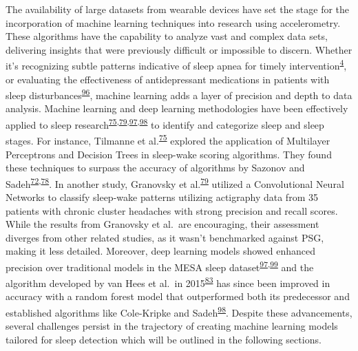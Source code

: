 \documentclass[
  10pt,
]{scrbook}
\begin{document}
The availability of large datasets from wearable devices have set the
stage for the incorporation of machine learning techniques into research
using accelerometry. These algorithms have the capability to analyze
vast and complex data sets, delivering insights that were previously
difficult or impossible to discern. Whether it's recognizing subtle
patterns indicative of sleep apnea for timely
intervention\textsuperscript{\protect\hyperlink{ref-cappuccio_sleep_2010}{4}},
or evaluating the effectiveness of antidepressant medications in
patients with sleep
disturbances\textsuperscript{\protect\hyperlink{ref-paruthi_consensus_2016}{96}},
machine learning adds a layer of precision and depth to data analysis.
Machine learning and deep learning methodologies have been effectively
applied to sleep
research\textsuperscript{\protect\hyperlink{ref-tilmanne_2009}{75},\protect\hyperlink{ref-granovsky_actigraphy-based_2018}{79},\protect\hyperlink{ref-palotti_benchmark_2019}{97},\protect\hyperlink{ref-sundararajan_sleep_2021}{98}}
to identify and categorize sleep and sleep stages. For instance,
Tilmanne et
al.\textsuperscript{\protect\hyperlink{ref-tilmanne_2009}{75}} explored
the application of Multilayer Perceptrons and Decision Trees in
sleep-wake scoring algorithms. They found these techniques to surpass
the accuracy of algorithms by Sazonov and
Sadeh\textsuperscript{\protect\hyperlink{ref-sadeh_activity-based_1994}{72},\protect\hyperlink{ref-sazonov_activity-based_2004}{78}}.
In another study, Granovsky et
al.\textsuperscript{\protect\hyperlink{ref-granovsky_actigraphy-based_2018}{79}}
utilized a Convolutional Neural Networks to classify sleep-wake patterns
utilizing actigraphy data from 35 patients with chronic cluster
headaches with strong precision and recall scores. While the results
from Granovsky et al.~are encouraging, their assessment diverges from
other related studies, as it wasn't benchmarked against PSG, making it
less detailed. Moreover, deep learning models showed enhanced precision
over traditional models in the MESA sleep
dataset\textsuperscript{\protect\hyperlink{ref-palotti_benchmark_2019}{97},\protect\hyperlink{ref-lutsey_objectively_2015}{99}}
and the algorithm developed by van Hees et al.~in
2015\textsuperscript{\protect\hyperlink{ref-hees_novel_2015}{83}} has
since been improved in accuracy with a random forest model that
outperformed both its predecessor and established algorithms like
Cole-Kripke and
Sadeh\textsuperscript{\protect\hyperlink{ref-sundararajan_sleep_2021}{98}}.
Despite these advancements, several challenges persist in the trajectory
of creating machine learning models tailored for sleep detection which
will be outlined in the following sections.
\end{document}
